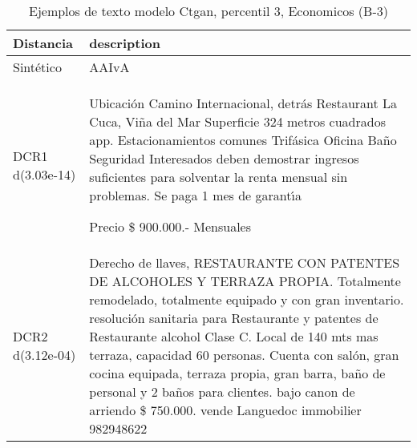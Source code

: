 \begin{table}[H]
\centering
\fontsize{10}{14}\selectfont
\caption{Ejemplos de texto modelo Ctgan, percentil 3, Economicos (B-3)}
\label{table-example-economicos-b-3-ctgan-3p-text}
\begin{tabular}{|l|m{35em}|}
\hline
\rowcolor[gray]{0.8}
Distancia & description \\
\hline Sintético & AAIvA \\
\hline DCR1 d(3.03e-14) & Ubicaci\'on Camino Internacional, detr\'as Restaurant La Cuca, Vi\~na del Mar
Superficie 324 metros cuadrados app.
Estacionamientos comunes
Trif\'asica 
Oficina
Ba\~no
Seguridad
Interesados deben demostrar ingresos suficientes para solventar la renta mensual sin problemas. 
Se paga 1 mes de garant{\'\i}a
 
Precio \$ 900.000.- Mensuales \\
\hline DCR2 d(3.12e-04) & Derecho de llaves, RESTAURANTE CON PATENTES DE ALCOHOLES Y TERRAZA PROPIA. Totalmente remodelado, totalmente equipado y con gran inventario. resoluci\'on sanitaria para Restaurante y patentes de Restaurante alcohol Clase C. Local de 140 mts mas terraza, capacidad 60 personas. Cuenta con sal\'on, gran cocina equipada, terraza propia, gran barra, ba\~no de personal y 2 ba\~nos para clientes. bajo canon de arriendo \$ 750.000. 
vende Languedoc immobilier 982948622 \\
\hline
\end{tabular}
\end{table}
